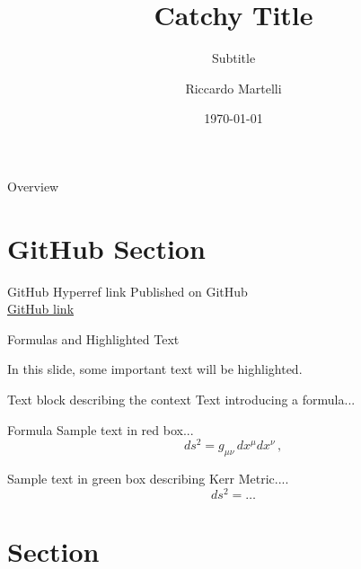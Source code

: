 \documentclass[aspectratio=169,xcolor=dvipsnames]{beamer}
\title{Catchy Title}
\subtitle{Subtitle}
\author{Riccardo Martelli}
\institute
{Institutions}
\date{\today}
\begin{document}
\begin{frame}
    \titlepage
\end{frame}

\begin{frame}{Overview}
    \tableofcontents
\end{frame}

\section{GitHub Section}

\begin{frame}{GitHub Hyperref link}
\centering
    \Huge Published on GitHub\\
    \href{https://github.com/Riccardo-Martelli/Riccardo-Beamer-Theme}{\faGithub GitHub link}
\end{frame}


\begin{frame}{Formulas and Highlighted Text}

    In this slide, some important text will be \alert{highlighted}.

    \begin{block}{Text block describing the context}
        Text introducing a formula...
    \end{block}

    \begin{alertblock}{Formula}
        Sample text in red box...
        \[ds^2 = g_{\mu\nu}\, dx^\mu dx^\nu\,,\]
    \end{alertblock}

    \begin{examples}
        Sample text in green box describing Kerr Metric....
        \[ds^2 = \dots\]
    \end{examples}

    
\end{frame}


\section{Section}
\end{document}
